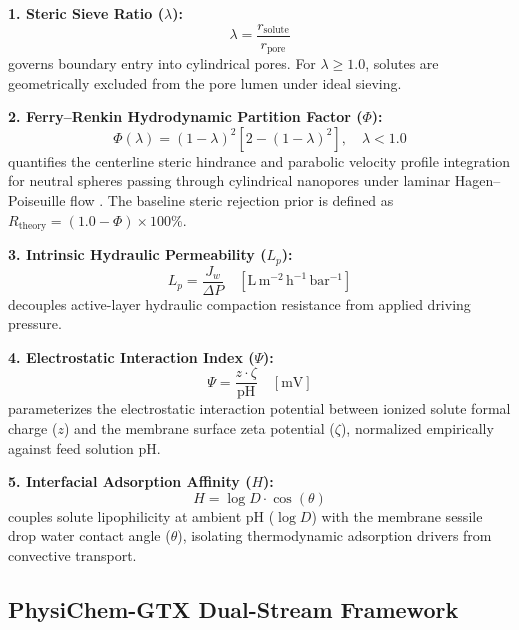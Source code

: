 \documentclass[10pt,twocolumn]{article}
\begin{document}
\textbf{1. Steric Sieve Ratio ($\lambda$):}
\begin{equation}
\lambda = \frac{r_{\mathrm{solute}}}{r_{\mathrm{pore}}}
\label{eq:lambda}
\end{equation}
governs boundary entry into cylindrical pores. For $\lambda \geq 1.0$, solutes are geometrically excluded from the pore lumen under ideal sieving.

\textbf{2. Ferry--Renkin Hydrodynamic Partition Factor ($\Phi$):}
\begin{equation}
\Phi(\lambda) = (1-\lambda)^2 \left[2 - (1-\lambda)^2\right], \quad \lambda < 1.0
\label{eq:ferry_renkin}
\end{equation}
quantifies the centerline steric hindrance and parabolic velocity profile integration for neutral spheres passing through cylindrical nanopores under laminar Hagen--Poiseuille flow \cite{ferry1936,renkin1954}. The baseline steric rejection prior is defined as $R_{\mathrm{theory}} = (1.0 - \Phi) \times 100\%$.

\textbf{3. Intrinsic Hydraulic Permeability ($L_p$):}
\begin{equation}
L_p = \frac{J_w}{\Delta P} \quad \left[\mathrm{L\,m^{-2}\,h^{-1}\,bar^{-1}}\right]
\label{eq:lp}
\end{equation}
decouples active-layer hydraulic compaction resistance from applied driving pressure.

\textbf{4. Electrostatic Interaction Index ($\Psi$):}
\begin{equation}
\Psi = \frac{z \cdot \zeta}{\mathrm{pH}} \quad [\mathrm{mV}]
\label{eq:psi}
\end{equation}
parameterizes the electrostatic interaction potential between ionized solute formal charge ($z$) and the membrane surface zeta potential ($\zeta$), normalized empirically against feed solution pH.

\textbf{5. Interfacial Adsorption Affinity ($H$):}
\begin{equation}
H = \log D \cdot \cos(\theta)
\label{eq:h_affinity}
\end{equation}
couples solute lipophilicity at ambient pH ($\log D$) with the membrane sessile drop water contact angle ($\theta$), isolating thermodynamic adsorption drivers from convective transport.

\subsection{PhysiChem-GTX Dual-Stream Framework}
\label{subsec:architecture}
\end{document}

